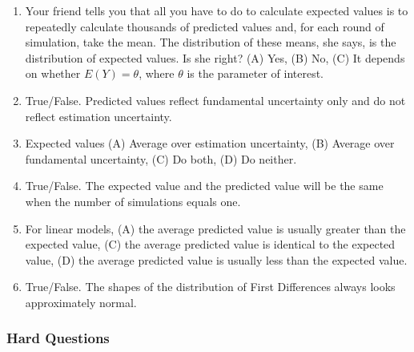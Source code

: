 \documentclass[11pt]{article}
\begin{document}
\begin{enumerate}
\item Your friend tells you that all you have to do to calculate expected values is to repeatedly calculate thousands of predicted values and, for each round of simulation, take the mean. The distribution of these means, she says, is the distribution of expected values.  Is she right? (A) Yes, (B) No, (C) It depends on whether $E(Y)=\theta$, where $\theta$ is the parameter of interest. 
\item True/False. Predicted values reflect fundamental uncertainty only and do not reflect estimation uncertainty. 
\item Expected values (A) Average over estimation uncertainty, (B) Average over fundamental uncertainty, (C) Do both, (D) Do neither. 
\item True/False.  The expected value and the predicted value will be the same when the number of simulations equals one. 
\item For linear models, (A) the average predicted value is usually greater than the expected value, (C) the average predicted value is identical to the expected value, (D) the average predicted value is usually less than the expected value. 
\item True/False.  The shapes of the distribution of First Differences always looks approximately normal.
\end{enumerate}

\subsubsection{Hard Questions}
\end{document}
